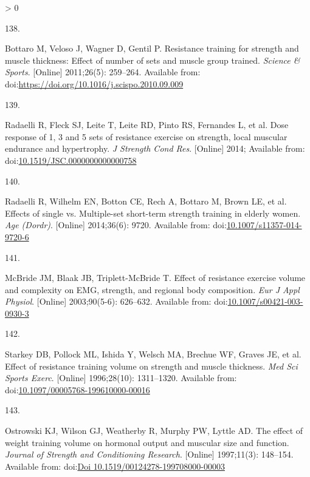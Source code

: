 \documentclass[twoside,10pt]{gihclass} %
\newlength{\cslhangindent}
\newlength{\csllabelwidth}
\newenvironment{CSLReferences}[3] %
 {%
  \setlength{\parindent}{0pt}
  \ifodd #1 \everypar{\setlength{\hangindent}{\cslhangindent}}\ignorespaces\fi
  \ifnum #2 > 0
  \setlength{\parskip}{#2\baselineskip}
  \fi
 }%
 {}
\newcommand{\CSLLeftMargin}[1]{\parbox[t]{\maxof{\widthof{#1}}{\csllabelwidth}}{#1}}
\newcommand{\CSLRightInline}[1]{\parbox[t]{\linewidth}{#1}}
\begin{document}
\begin{CSLReferences}{0}{0}
\leavevmode\hypertarget{ref-RN2463}{}%
\CSLLeftMargin{138. }
\CSLRightInline{Bottaro M, Veloso J, Wagner D, Gentil P. Resistance training for strength and muscle thickness: Effect of number of sets and muscle group trained. \emph{Science \& Sports}. {[}Online{]} 2011;26(5): 259--264. Available from: doi:\url{https://doi.org/10.1016/j.scispo.2010.09.009}}

\leavevmode\hypertarget{ref-RN1570}{}%
\CSLLeftMargin{139. }
\CSLRightInline{Radaelli R, Fleck SJ, Leite T, Leite RD, Pinto RS, Fernandes L, et al. Dose response of 1, 3 and 5 sets of resistance exercise on strength, local muscular endurance and hypertrophy. \emph{J Strength Cond Res}. {[}Online{]} 2014; Available from: doi:\href{https://doi.org/10.1519/JSC.0000000000000758}{10.1519/JSC.0000000000000758}}

\leavevmode\hypertarget{ref-RN1518}{}%
\CSLLeftMargin{140. }
\CSLRightInline{Radaelli R, Wilhelm EN, Botton CE, Rech A, Bottaro M, Brown LE, et al. Effects of single vs. Multiple-set short-term strength training in elderly women. \emph{Age (Dordr)}. {[}Online{]} 2014;36(6): 9720. Available from: doi:\href{https://doi.org/10.1007/s11357-014-9720-6}{10.1007/s11357-014-9720-6}}

\leavevmode\hypertarget{ref-RN1474}{}%
\CSLLeftMargin{141. }
\CSLRightInline{McBride JM, Blaak JB, Triplett-McBride T. Effect of resistance exercise volume and complexity on EMG, strength, and regional body composition. \emph{Eur J Appl Physiol}. {[}Online{]} 2003;90(5-6): 626--632. Available from: doi:\href{https://doi.org/10.1007/s00421-003-0930-3}{10.1007/s00421-003-0930-3}}

\leavevmode\hypertarget{ref-RN1456}{}%
\CSLLeftMargin{142. }
\CSLRightInline{Starkey DB, Pollock ML, Ishida Y, Welsch MA, Brechue WF, Graves JE, et al. Effect of resistance training volume on strength and muscle thickness. \emph{Med Sci Sports Exerc}. {[}Online{]} 1996;28(10): 1311--1320. Available from: doi:\href{https://doi.org/10.1097/00005768-199610000-00016}{10.1097/00005768-199610000-00016}}

\leavevmode\hypertarget{ref-RN1454}{}%
\CSLLeftMargin{143. }
\CSLRightInline{Ostrowski KJ, Wilson GJ, Weatherby R, Murphy PW, Lyttle AD. The effect of weight training volume on hormonal output and muscular size and function. \emph{Journal of Strength and Conditioning Research}. {[}Online{]} 1997;11(3): 148--154. Available from: doi:\href{https://doi.org/Doi\%2010.1519/00124278-199708000-00003}{Doi 10.1519/00124278-199708000-00003}}


\end{CSLReferences}
\end{document}
